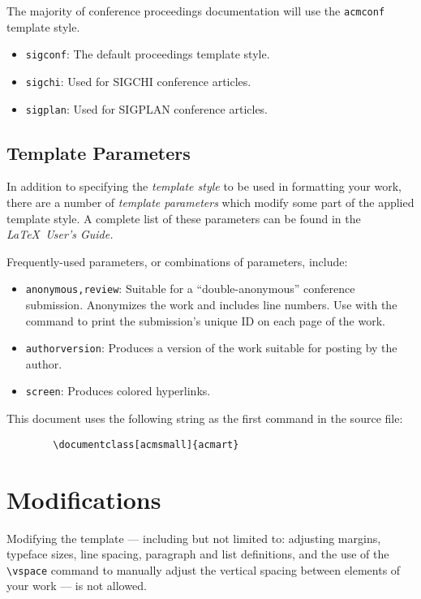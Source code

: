\documentclass[acmsmall]{acmart}
\begin{document}
	The majority of conference proceedings documentation will use the {\verb|acmconf|} template style.
	\begin{itemize}
		\item {\texttt{sigconf}}: The default proceedings template style.
		\item{\texttt{sigchi}}: Used for SIGCHI conference articles.
		\item{\texttt{sigplan}}: Used for SIGPLAN conference articles.
	\end{itemize}
	
	\subsection{Template Parameters}
	
	In addition to specifying the {\itshape template style} to be used in
	formatting your work, there are a number of {\itshape template parameters}
	which modify some part of the applied template style. A complete list
	of these parameters can be found in the {\itshape \LaTeX\ User's Guide.}
	
	Frequently-used parameters, or combinations of parameters, include:
	\begin{itemize}
		\item {\texttt{anonymous,review}}: Suitable for a ``double-anonymous''
		conference submission. Anonymizes the work and includes line
		numbers. Use with the \texttt{\string\acmSubmissionID} command to print the
		submission's unique ID on each page of the work.
		\item{\texttt{authorversion}}: Produces a version of the work suitable
		for posting by the author.
		\item{\texttt{screen}}: Produces colored hyperlinks.
	\end{itemize}
	
	This document uses the following string as the first command in the
	source file:
	\begin{verbatim}
		\documentclass[acmsmall]{acmart}
	\end{verbatim}
	
	\section{Modifications}
	
	Modifying the template --- including but not limited to: adjusting
	margins, typeface sizes, line spacing, paragraph and list definitions,
	and the use of the \verb|\vspace| command to manually adjust the
	vertical spacing between elements of your work --- is not allowed.
	
\end{document}
